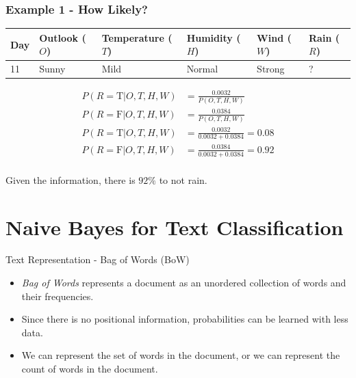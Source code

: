 \documentclass[aspectratio=169, 10pt]{beamer}
\begin{document}
\begin{frame}[t]
    \frametitle{Example 1 - How Likely?}
    \begin{table}[]
        \small
        \begin{tabular}{l|llll|l}
        \textbf{Day} & \textbf{Outlook} ($O$) & \textbf{Temperature} ($T$) & \textbf{Humidity} ($H$) & \textbf{Wind} ($W$) & \textbf{Rain} ($R$) \\ \hline
        11           & Sunny            & Mild                 & Normal            & Strong        & ?            
        \end{tabular}
    \end{table}

    \begin{align*}
        P(R=\text{T}|O,T,H,W) & = \frac{0.0032}{P(O,T,H,W)}\\
        P(R=\text{F}|O,T,H,W) & = \frac{0.0384}{P(O,T,H,W)}\\
        P(R=\text{T}|O,T,H,W) & = \frac{0.0032}{0.0032 + 0.0384} = 0.08\\
        P(R=\text{F}|O,T,H,W) & = \frac{0.0384}{0.0032 + 0.0384} = 0.92\\
    \end{align*}

    Given the information, there is $92\%$ to not rain.
\end{frame}

\section{Naive Bayes for Text Classification}
\begin{frame}{Text Representation - Bag of Words (BoW)}
    \begin{itemize}
        \item \textit{Bag of Words} represents a document as an unordered collection of words and their frequencies.
        \item Since there is no positional information, probabilities can be learned with less data.
        \item We can represent the set of words in the document, or we can represent the count of words in the document.
    \end{itemize}
\end{frame}
\end{document}
